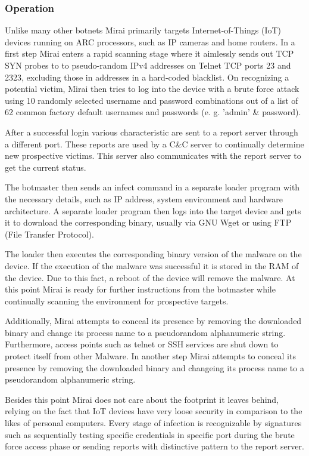 \subsubsection{Operation}
		Unlike many other botnets Mirai primarily targets Internet-of-Things (IoT) devices running on ARC processors, such as IP cameras and home routers. In a first step Mirai enters a rapid scanning stage where it aimlessly sends out TCP SYN probes to to pseudo-random IPv4 addresses on Telnet TCP ports 23 and 2323, excluding those in addresses in a hard-coded blacklist. On recognizing a potential victim, Mirai then tries to log into the device with a brute force attack using 10 randomly selected username and password combinations out of a list of 62 common factory default usernames and passwords (e. g. 'admin' \& password).
		
After a successful login various characteristic are sent to a report server through a different port. These reports are used by a C\&C server to continually determine new prospective victims. This server also communicates with the report server to get the current status.

The botmaster then sends an infect command in a separate loader program with the necessary details, such as IP address, system environment and hardware architecture. A separate loader program then logs into the target device and gets it to download the corresponding binary, usually via GNU Wget or using FTP (File Transfer Protocol). 

The loader then executes the corresponding binary version of the malware on the device. If the execution of the malware was successful it is stored in the RAM of the device. Due to this fact, a reboot of the device will remove the malware. At this point Mirai is ready for further instructions from the botmaster while continually scanning the environment for prospective targets.

Additionally, Mirai attempts to conceal its presence by removing the downloaded binary and change its process name to a pseudorandom alphanumeric string. Furthermore, access points such as telnet or SSH services are shut down to protect itself from other Malware. In another step Mirai attempts to conceal its presence by removing the downloaded binary and changeing its process name to a pseudorandom alphanumeric string.

Besides this point Mirai does not care about the footprint it leaves behind, relying on the fact that IoT devices have very loose security in comparison to the likes of personal computers. Every stage of infection is recognizable by signatures such as sequentially testing specific credentials in specific port during the brute force access phase or sending reports with distinctive pattern to the report server.

